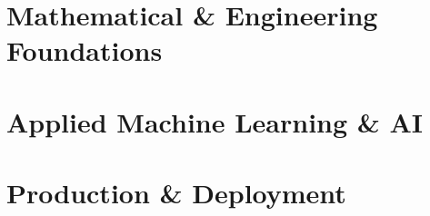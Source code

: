 \documentclass[11pt,a4paper,oneside]{book}
\begin{document}
\part{Mathematical \& Engineering Foundations}



\part{Applied Machine Learning \& AI}







\part{Production \& Deployment}


\backmatter

\printbibliography[heading=bibintoc,title={References}]
\end{document}
